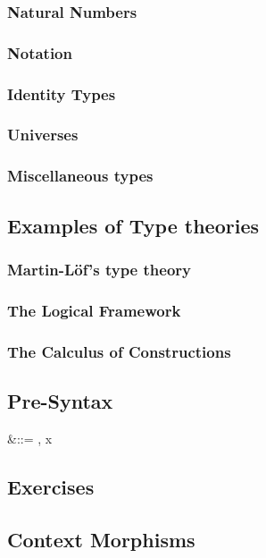 \documentclass{article}
\begin{document}
\subsubsection{Natural Numbers}

\subsubsection{Notation}

\subsubsection{Identity Types}

\subsubsection{Universes}

\subsubsection{Miscellaneous types}

\subsection{Examples of Type theories}

\subsubsection{Martin-L\"of's type theory}

\subsubsection{The Logical Framework}

\subsubsection{The Calculus of Constructions}


\subsection{Pre-Syntax}

\begin{syntax}
\Gamma &::= \diamond \mid \Gamma, x\co\sigma
\end{syntax}

\subsection*{Exercises}


\subsection{Context Morphisms}
\end{document}
